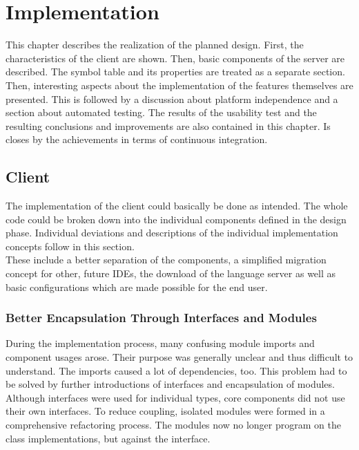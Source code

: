 \section{Implementation}
\label{chapter:implementation}
This chapter describes the realization of the planned design.
First, the characteristics of the client are shown.
Then, basic components of the server are described.
The symbol table and its properties are treated as a separate section.
Then, interesting aspects about the implementation of the features themselves are presented.
This is followed by a discussion about platform independence and a section about automated testing.
The results of the usability test and the resulting conclusions and improvements are also contained in this chapter.
Is closes by the achievements in terms of continuous integration.

\subsection{Client}
The implementation of the client could basically be done as intended.
The whole code could be broken down into the individual components defined in the design phase.
Individual deviations and descriptions of the individual implementation concepts follow in this section. \\

These include a better separation of the components,
a simplified migration concept for other, future IDEs,
the download of the language server
as well as basic configurations which are made possible for the end user.

\subsubsection{Better Encapsulation Through Interfaces and Modules}
\label{section:implementation:client:module_encapsulation}

During the implementation process, many confusing module imports and component usages arose.
Their purpose was generally unclear and thus difficult to understand.
The imports caused a lot of dependencies, too.
This problem had to be solved by further introductions of interfaces and encapsulation of modules. \\

Although interfaces were used for individual types,
core components did not use their own interfaces.
To reduce coupling, isolated modules were formed in a comprehensive refactoring process.
The modules now no longer program on the class implementations, but against the interface. \\

